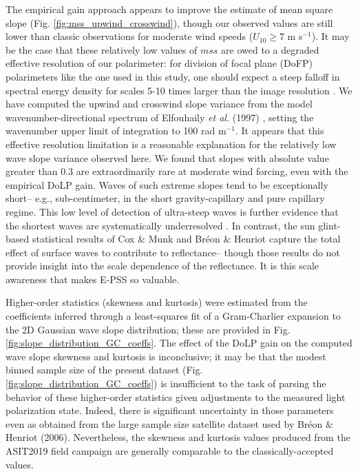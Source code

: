 \documentclass[letterpaper,draftcls,onecolumn]{IEEEtran}
\begin{document}
The empirical gain approach appears to improve the estimate of mean square slope (Fig. \ref{fig:mss_upwind_crosswind}), though our observed values are still lower than classic observations \cite{Cox1954a,Breon2006} for moderate wind speeds ($U_{10}\geq7$ m s$^{-1}$). It may be the case that these relatively low values of $mss$ are owed to a degraded effective resolution of our polarimeter: for division of focal plane (DoFP) polarimeters like the one used in this study, one should expect a steep falloff in spectral energy density for scales 5-10 times larger than the image resolution \cite{laxague_effects_2025}. We have computed the upwind and crosswind slope variance from the model wavenumber-directional spectrum of Elfouhaily \emph{et al.} (1997) \cite{Elfouhaily1997}, setting the wavenumber upper limit of integration to 100 rad m$^{-1}$. It appears that this effective resolution limitation \cite{laxague_effects_2025} is a reasonable explanation for the relatively low wave slope variance observed here. We found that slopes with absolute value greater than 0.3 are extraordinarily rare at moderate wind forcing, even with the empirical DoLP gain. Waves of such extreme slopes tend to be exceptionally short-- e.g., sub-centimeter, in the short gravity-capillary and pure capillary regime. This low level of detection of ultra-steep waves is further evidence that the shortest waves are systematically underresolved \cite{laxague_effects_2025}. In contrast, the sun glint-based statistical results of Cox \& Munk and Br\'eon \& Henriot capture the total effect of surface waves to contribute to reflectance-- though those results do not provide insight into the scale dependence of the reflectance. It is this scale awareness that makes E-PSS so valuable.

Higher-order statistics (skewness and kurtosis) were estimated from the coefficients inferred through a least-squares fit of a Gram-Charlier expansion to the 2D Gaussian wave slope distribution; these are provided in Fig. \ref{fig:slope_distribution_GC_coeffs}. The effect of the DoLP gain on the computed wave slope skewness and kurtosis is inconclusive; it may be that the modest binned sample size of the present dataset (Fig. \ref{fig:slope_distribution_GC_coeffs}) is insufficient to the task of parsing the behavior of these higher-order statistics given adjustments to the measured light polarization state. Indeed, there is significant uncertainty in those parameters even as obtained from the large sample size satellite dataset used by Br\'eon \& Henriot (2006). Nevertheless, the skewness and kurtosis values produced from the ASIT2019 field campaign are generally comparable to the classically-accepted values.
\end{document}
